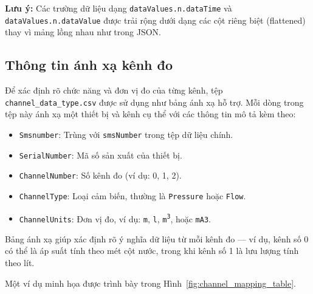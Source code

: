 \noindent
\textbf{Lưu ý:} Các trường dữ liệu dạng \texttt{dataValues.n.dataTime} và \texttt{dataValues.n.dataValue} được trải rộng dưới dạng các cột riêng biệt (flattened) thay vì mảng lồng nhau như trong JSON.

\vspace{1em}


\subsection{Thông tin ánh xạ kênh đo}

Để xác định rõ chức năng và đơn vị đo của từng kênh, tệp \texttt{channel\_data\_type.csv} được sử dụng như bảng ánh xạ hỗ trợ. Mỗi dòng trong tệp này ánh xạ một thiết bị và kênh cụ thể với các thông tin mô tả kèm theo:

\begin{itemize}
    \item \texttt{Smsnumber}: Trùng với \texttt{smsNumber} trong tệp dữ liệu chính.
    \item \texttt{SerialNumber}: Mã số sản xuất của thiết bị.
    \item \texttt{ChannelNumber}: Số kênh đo (ví dụ: 0, 1, 2).
    \item \texttt{ChannelType}: Loại cảm biến, thường là \texttt{Pressure} hoặc \texttt{Flow}.
    \item \texttt{ChannelUnits}: Đơn vị đo, ví dụ: \texttt{m}, \texttt{l}, \texttt{m\textsuperscript{3}}, hoặc \texttt{mA3}.
\end{itemize}

\noindent
Bảng ánh xạ giúp xác định rõ ý nghĩa dữ liệu từ mỗi kênh đo — ví dụ, kênh số 0 có thể là áp suất tính theo mét cột nước, trong khi kênh số 1 là lưu lượng tính theo lít.

\vspace{0.5em}
Một ví dụ minh họa được trình bày trong Hình~\ref{fig:channel_mapping_table}.

